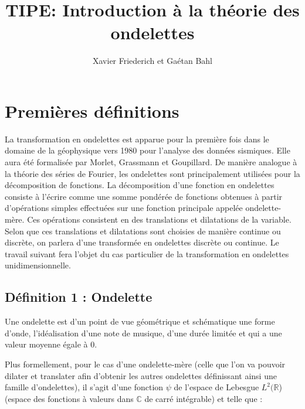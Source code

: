 \documentclass{article}
\title{TIPE: Introduction à la théorie des ondelettes}
\author{Xavier Friederich et Gaétan Bahl}
\begin{document}
\maketitle
\tableofcontents
\listoffigures
{}
\clearpage

\newcommand{\fonction}[5]{\begin{array}{l|rcl}
#1: & #2 & \longrightarrow & #3 \\
    & #4 & \longmapsto & #5 \end{array}}

\section{Premières définitions}


La transformation en ondelettes est apparue pour la première fois dans le domaine de la géophysique vers 1980 pour l’analyse des données sismiques. Elle aura été formalisée par Morlet, Grassmann et Goupillard.
De manière analogue à la théorie des séries de Fourier, les ondelettes sont principalement utilisées pour la décomposition de fonctions. La décomposition d’une fonction en ondelettes consiste à l’écrire comme une somme pondérée de fonctions obtenues à partir d’opérations simples effectuées sur une fonction principale appelée ondelette-mère. Ces opérations consistent en des translations et dilatations de la variable. Selon que ces translations et dilatations sont choisies de manière continue ou discrète, on parlera d’une transformée en ondelettes discrète ou continue.
Le travail suivant fera l’objet du cas particulier de la transformation en ondelettes unidimensionnelle.



\subsection{Définition 1 : Ondelette}

Une ondelette est d’un point de vue géométrique et schématique une forme d’onde, l’idéalisation d’une note de musique, d’une durée limitée et qui a une valeur moyenne égale à 0. 

Plus formellement, pour le cas d’une ondelette-mère (celle que l’on va pouvoir dilater et translater afin d’obtenir les autres ondelettes définissant ainsi une famille d’ondelettes), il s’agit d’une fonction $\psi$ de l'espace de Lebesgue $L^2(\mathbb{R}$) (espace des fonctions à valeurs dans $\mathbb{C}$ de carré intégrable) et telle que :
\end{document}
